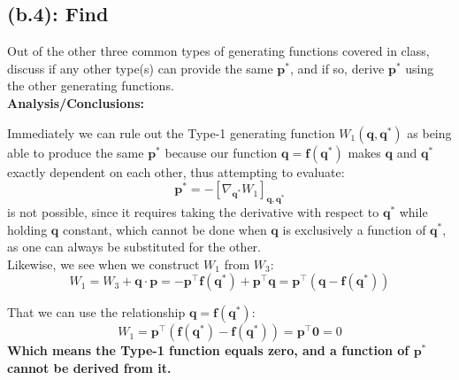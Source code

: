 \documentclass[titlepage]{article}
\begin{document}
\newpage

\subsection*{(b.4): Find}

Out of the other three common types of generating functions covered in class, discuss if any other type(s) can provide the same $\boldsymbol{p}^*$, and if so, derive $\boldsymbol{p}^*$ using the other generating functions. \\

\textbf{Analysis/Conclusions:} \\

\begin{mdframed}[linewidth=1pt, innertopmargin=10pt, innerbottommargin=10pt]
	Immediately we can rule out the Type-1 generating function $W_1(\boldsymbol{q},\boldsymbol{q}^*)$ as being able to produce the same $\boldsymbol{p}^*$ because our function $\boldsymbol{q}=\boldsymbol{f}(\boldsymbol{q}^*)$ makes $\boldsymbol{q}$ and $\boldsymbol{q}^*$ exactly dependent on each other, thus attempting to evaluate:
	\begin{equation}
		\boldsymbol{p}^*=-\left[\nabla_{\boldsymbol{q}^*}W_1\right]_{\boldsymbol{q},\boldsymbol{q}^*}
	\end{equation}
	is not possible, since it requires taking the derivative with respect to $\boldsymbol{q}^*$ while holding $\boldsymbol{q}$ constant, which cannot be done when $\boldsymbol{q}$ is exclusively a function of $\boldsymbol{q}^*$, as one can always be substituted for the other. \\
	
	Likewise, we see when we construct $W_1$ from $W_3$:
	\begin{equation}
		W_1=W_3+\boldsymbol{q}\cdot\boldsymbol{p}=-\boldsymbol{p}^\top\boldsymbol{f}(\boldsymbol{q}^*)+\boldsymbol{p}^\top\boldsymbol{q}=\boldsymbol{p}^\top\left(\boldsymbol{q}-\boldsymbol{f}(\boldsymbol{q}^*)\right)
	\end{equation}
	
	That we can use the relationship $\boldsymbol{q}=\boldsymbol{f}(\boldsymbol{q}^*)$:
	\begin{equation}
		W_1=\boldsymbol{p}^\top\left(\boldsymbol{f}(\boldsymbol{q}^*)-\boldsymbol{f}(\boldsymbol{q}^*)\right)=\boldsymbol{p}^\top\boldsymbol{0}=0
	\end{equation}
	\textbf{Which means the Type-1 function equals zero, and a function of $\boldsymbol{p}^*$ cannot be derived from it.}
\end{mdframed}
\end{document}
